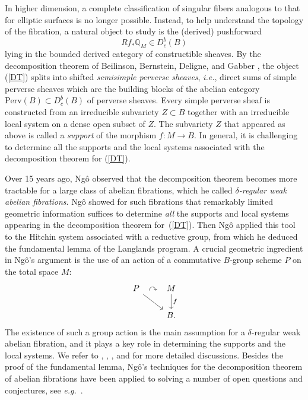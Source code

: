 \documentclass[11pt]{amsart}
\theoremstyle{plain}
\theoremstyle{definition}
\theoremstyle{remark}
\newcommand{\BQ}{{\mathbb{Q}}}
\begin{document}
In higher dimension, a complete classification of singular fibers analogous to that for elliptic surfaces is no longer possible. Instead, to help understand the topology of the fibration, a natural object to study is the (derived) pushforward
\begin{equation}\label{DT}
Rf_*\BQ_M \in D^b_c(B)
\end{equation}
lying in the bounded derived category of constructible sheaves. By the decomposition theorem of Beilinson, Bernstein, Deligne, and Gabber \cite{BBD}, the object (\ref{DT}) splits into shifted \emph{semisimple perverse sheaves}, \emph{i.e.}, direct sums of simple perverse sheaves which are the building blocks of the abelian category $\mathrm{Perv}(B) \subset D^b_c(B)$ of perverse sheaves. Every simple perverse sheaf is constructed from an irreducible subvariety $Z \subset B$ together with an irreducible local system on a dense open subset of $Z$. The subvariety $Z$ that appeared as above is called a \emph{support} of the morphism $f: M\to B$. In general, it is challenging to determine all the supports and the local systems associated with the decomposition theorem for (\ref{DT}).



Over 15 years ago, Ng\^o \cite{Ngo} observed that the decomposition theorem becomes more tractable for a large class of abelian fibrations, which he called \emph{$\delta$-regular weak abelian fibrations}. Ng\^o showed for such fibrations that remarkably limited geometric information suffices to determine \emph{all} the supports and local systems appearing in the decomposition theorem for~(\ref{DT}). Then Ng\^o applied this tool to the Hitchin system associated with a reductive group, from which he deduced the fundamental lemma of the Langlands program. A crucial geometric ingredient in Ng\^o's argument is the use of an action of a commutative $B$-group scheme $P$ on the total space $M$:
\[
\begin{tikzcd}
P \arrow[dr] 
\arrow[r, phantom, "\;\curvearrowright\;"] 
& M \arrow[d, "f"] \\
& B.
\end{tikzcd}
\]
The existence of such a group action is the main assumption for a $\delta$-regular weak abelian fibration, and it plays a key role in determining the supports and the local systems. We refer to \cite[Section 7]{Ngo}, \cite{Ngo_survey}, \cite[Section 1]{Shen_survey}, and \cite[Section 1]{MS_chi} for more detailed discussions. Besides the proof of the fundamental lemma, Ng\^o's techniques for the decomposition theorem of abelian fibrations have been applied to solving a number of open questions and conjectures, see \emph{e.g.}~\cite{dCRS, MS_HT, MS_chi, MS_PW, MT, MY}.
\end{document}
